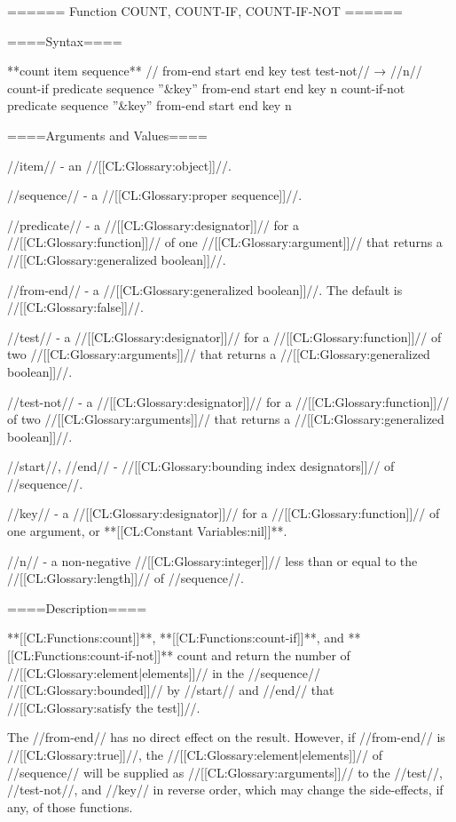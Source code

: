 ====== Function COUNT, COUNT-IF, COUNT-IF-NOT ======

====Syntax====

**count {item sequence** //\key} from-end start end key test test-not// → //n// \DefunWithValues count-if {predicate sequence ''&key'' from-end start end key} {n} \DefunWithValues count-if-not {predicate sequence ''&key'' from-end start end key} {n}

====Arguments and Values====

//item// - an //[[CL:Glossary:object]]//.

//sequence// - a //[[CL:Glossary:proper sequence]]//.

//predicate// - a //[[CL:Glossary:designator]]// for a //[[CL:Glossary:function]]// of one //[[CL:Glossary:argument]]// that returns a //[[CL:Glossary:generalized boolean]]//.

//from-end// - a //[[CL:Glossary:generalized boolean]]//. The default is //[[CL:Glossary:false]]//.

//test// - a //[[CL:Glossary:designator]]// for a //[[CL:Glossary:function]]// of two //[[CL:Glossary:arguments]]// that returns a //[[CL:Glossary:generalized boolean]]//.

//test-not// - a //[[CL:Glossary:designator]]// for a //[[CL:Glossary:function]]// of two //[[CL:Glossary:arguments]]// that returns a //[[CL:Glossary:generalized boolean]]//.

//start//, //end// - //[[CL:Glossary:bounding index designators]]// of //sequence//. 

//key// - a //[[CL:Glossary:designator]]// for a //[[CL:Glossary:function]]// of one argument, or **[[CL:Constant Variables:nil]]**.

//n// - a non-negative //[[CL:Glossary:integer]]// less than or equal to the //[[CL:Glossary:length]]// of //sequence//.

====Description====

**[[CL:Functions:count]]**, **[[CL:Functions:count-if]]**, and **[[CL:Functions:count-if-not]]** count and return the number of //[[CL:Glossary:element|elements]]// in the //sequence// //[[CL:Glossary:bounded]]// by //start// and //end// that //[[CL:Glossary:satisfy the test]]//.

The //from-end// has no direct effect on the result. However, if //from-end// is //[[CL:Glossary:true]]//, the //[[CL:Glossary:element|elements]]// of //sequence// will be supplied as //[[CL:Glossary:arguments]]// to the //test//, //test-not//, and //key// in reverse order, which may change the side-effects, if any, of those functions.

